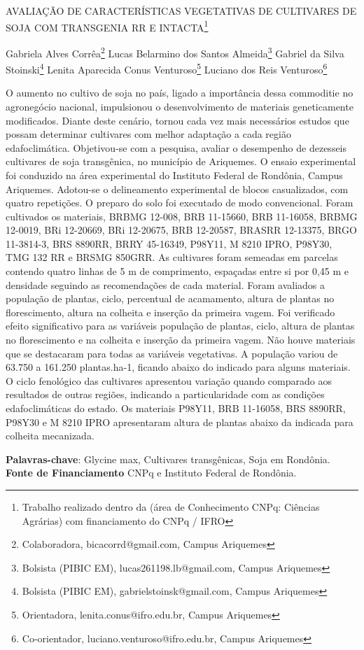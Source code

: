 \documentclass[article,12pt,onesidea,4paper,english,brazil]{abntex2}
\begin{document}
	
	
	\frenchspacing 
	
	\begin{center}
		\LARGE AVALIAÇÃO DE CARACTERÍSTICAS VEGETATIVAS DE CULTIVARES DE SOJA COM TRANSGENIA RR E INTACTA\footnote{Trabalho realizado dentro da (área de Conhecimento CNPq: Ciências Agrárias) com financiamento do CNPq / IFRO}
		
		\normalsize
	Gabriela Alves Corrêa\footnote{Colaboradora, bicacorrd@gmail.com, Campus Ariquemes} 
		Lucas Belarmino dos Santos Almeida\footnote{Bolsista (PIBIC EM), lucas261198.lb@gmail.com, Campus Ariquemes} 
		Gabriel da Silva Stoinski\footnote{Bolsista (PIBIC EM), gabrielstoinsk@gmail.com, Campus Ariquemes} 
		Lenita Aparecida Conus Venturoso\footnote{Orientadora, lenita.conus@ifro.edu.br, Campus Ariquemes} 
		Luciano dos Reis Venturoso\footnote{Co-orientador, luciano.venturoso@ifro.edu.br, Campus Ariquemes}
		
	\end{center}
	
	\noindent O aumento no cultivo de soja no país, ligado a importância dessa commoditie no agronegócio nacional, impulsionou o desenvolvimento de materiais geneticamente modificados. Diante deste cenário, tornou cada vez mais necessários estudos que possam determinar cultivares com melhor adaptação a cada região edafoclimática. Objetivou-se com a pesquisa, avaliar o desempenho de dezesseis cultivares de soja transgênica, no município de Ariquemes. O ensaio experimental foi conduzido na área experimental do Instituto Federal de Rondônia, Campus Ariquemes. Adotou-se o delineamento experimental de blocos casualizados, com quatro repetições. O preparo do solo foi executado de modo convencional. Foram cultivados os materiais, BRBMG 12-008, BRB 11-15660, BRB 11-16058, BRBMG 12-0019, BRi 12-20669, BRi 12-20675, BRB 12-20587, BRASRR 12-13375, BRGO 11-3814-3, BRS 8890RR, BRRY 45-16349, P98Y11, M 8210 IPRO, P98Y30, TMG 132 RR e BRSMG 850GRR. As cultivares foram semeadas em parcelas contendo quatro linhas de 5 m de comprimento, espaçadas entre si por 0,45 m e densidade seguindo as recomendações de cada material. Foram avaliados a população de plantas, ciclo, percentual de acamamento, altura de plantas no florescimento, altura na colheita e inserção da primeira vagem. Foi verificado efeito significativo para as variáveis população de plantas, ciclo, altura de plantas no florescimento e na colheita e inserção da primeira vagem. Não houve materiais que se destacaram para todas as variáveis vegetativas. A população variou de 63.750 a 161.250 plantas.ha-1, ficando abaixo do indicado para alguns materiais. O ciclo fenológico das cultivares apresentou variação quando comparado aos resultados de outras regiões, indicando a particularidade com as condições edafoclimáticas do estado. Os materiais P98Y11, BRB 11-16058, BRS 8890RR, P98Y30 e M 8210 IPRO apresentaram altura de plantas abaixo da indicada para colheita mecanizada.
	
	\vspace{\onelineskip}
	
	\noindent
	\textbf{Palavras-chave}: Glycine max, Cultivares transgênicas, Soja em Rondônia. \\
	\textbf{Fonte de Financiamento} CNPq e Instituto Federal de Rondônia.
	
\end{document}
